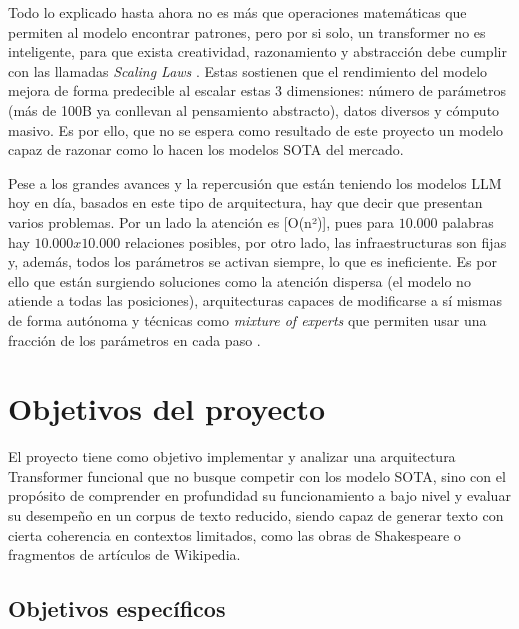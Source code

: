 \documentclass[11pt]{book}
\newcommand{\clearemptydoublepage}{\newpage{\pagestyle{empty}\cleardoublepage}}
\begin{document}
Todo lo explicado hasta ahora no es más que operaciones matemáticas que permiten al modelo encontrar patrones, pero por si solo, un transformer no es inteligente, para que exista creatividad, razonamiento y abstracción debe cumplir con las llamadas \textit{Scaling Laws} \parencite{wolfe_llm_scaling}. Estas sostienen que el rendimiento del modelo mejora de forma predecible al escalar estas 3 dimensiones: número de parámetros (más de 100B ya conllevan al pensamiento abstracto), datos diversos y cómputo masivo. Es por ello, que no se espera como resultado de este proyecto un modelo capaz de razonar como lo hacen los modelos SOTA del mercado.

Pese a los grandes avances y la repercusión que están teniendo los modelos LLM hoy en día, basados en este tipo de arquitectura, hay que decir que presentan varios problemas. Por un lado la atención es [O(n²)], pues para $10.000$ palabras hay $10.000 x 10.000$ relaciones posibles, por otro lado, las infraestructuras son fijas y, además, todos los parámetros se activan siempre, lo que es ineficiente. Es por ello que están surgiendo soluciones como la atención dispersa (el modelo no atiende a todas las posiciones), arquitecturas capaces de modificarse a sí mismas de forma autónoma y técnicas como \textit{mixture of experts} que permiten usar una fracción de los parámetros en cada paso \parencite{plainenglish2021gpt}.


\clearemptydoublepage

\chapter{Objetivos del proyecto}

El proyecto tiene como objetivo implementar y analizar una arquitectura Transformer funcional que no busque competir con los modelo SOTA, sino con el propósito de comprender en profundidad su funcionamiento a bajo nivel y evaluar su desempeño en un corpus de texto reducido, siendo capaz de generar texto con cierta coherencia en contextos limitados, como las obras de Shakespeare o fragmentos de artículos de Wikipedia.

\section{Objetivos específicos}
\end{document}
